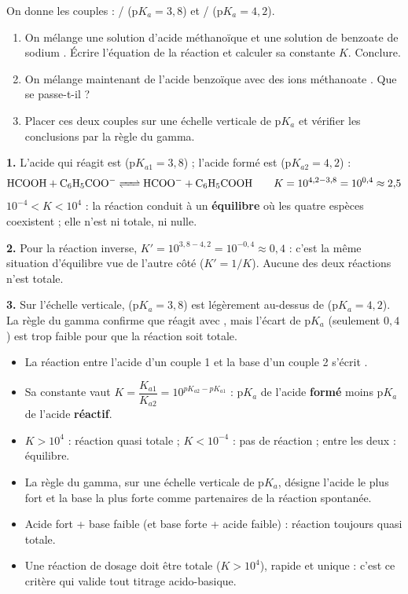 \documentclass[11pt]{article}
\begin{document}
\begin{exercice}
On donne les couples : / (p$K_a = 3{,}8$) et / (p$K_a = 4{,}2$).
\begin{enumerate}
\item On mélange une solution d'acide méthanoïque  et une solution de benzoate de sodium . Écrire l'équation de la réaction et calculer sa constante $K$. Conclure.
\item On mélange maintenant de l'acide benzoïque  avec des ions méthanoate . Que se passe-t-il ?
\item Placer ces deux couples sur une échelle verticale de p$K_a$ et vérifier les conclusions par la règle du gamma.
\end{enumerate}
\end{exercice}

\begin{corrige}[Exercice 1]
\textbf{1.} L'acide qui réagit est  (p$K_{a1} = 3{,}8$) ; l'acide formé est  (p$K_{a2} = 4{,}2$) :
\[ \ce{HCOOH + C6H5COO- <=> HCOO- + C6H5COOH} \qquad K = 10^{4{,}2 - 3{,}8} = 10^{0{,}4} \approx 2{,}5 \]
$10^{-4} < K < 10^{4}$ : la réaction conduit à un \textbf{équilibre} où les quatre espèces coexistent ; elle n'est ni totale, ni nulle.

\textbf{2.} Pour la réaction inverse, $K' = 10^{3{,}8 - 4{,}2} = 10^{-0{,}4} \approx 0{,}4$ : c'est la même situation d'équilibre vue de l'autre côté ($K' = 1/K$). Aucune des deux réactions n'est totale.

\textbf{3.} Sur l'échelle verticale,  (p$K_a = 3{,}8$) est légèrement au-dessus de  (p$K_a = 4{,}2$). La règle du gamma confirme que  réagit avec , mais l'écart de p$K_a$ (seulement $0{,}4$) est trop faible pour que la réaction soit totale.
\end{corrige}

\begin{aretenir}
\begin{itemize}
\item La réaction entre l'acide d'un couple 1 et la base d'un couple 2 s'écrit .
\item Sa constante vaut $K = \dfrac{K_{a1}}{K_{a2}} = 10^{pK_{a2} - pK_{a1}}$ : p$K_a$ de l'acide \textbf{formé} moins p$K_a$ de l'acide \textbf{réactif}.
\item $K > 10^{4}$ : réaction quasi totale ; $K < 10^{-4}$ : pas de réaction ; entre les deux : équilibre.
\item La règle du gamma, sur une échelle verticale de p$K_a$, désigne l'acide le plus fort et la base la plus forte comme partenaires de la réaction spontanée.
\item Acide fort + base faible (et base forte + acide faible) : réaction toujours quasi totale.
\item Une réaction de dosage doit être totale ($K > 10^{4}$), rapide et unique : c'est ce critère qui valide tout titrage acido-basique.
\end{itemize}
\end{aretenir}
\end{document}
